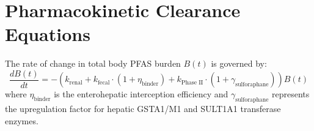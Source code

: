 \documentclass[11pt,a4paper]{article}
\begin{document}
\section{Pharmacokinetic Clearance Equations}
The rate of change in total body PFAS burden $B(t)$ is governed by:
\begin{equation}
\frac{dB(t)}{dt} = - \left( k_{\text{renal}} + k_{\text{fecal}} \cdot (1 + \eta_{\text{binder}}) + k_{\text{Phase II}} \cdot (1 + \gamma_{\text{sulforaphane}}) \right) B(t)
\end{equation}
where $\eta_{\text{binder}}$ is the enterohepatic interception efficiency and $\gamma_{\text{sulforaphane}}$ represents the upregulation factor for hepatic GSTA1/M1 and SULT1A1 transferase enzymes.
\end{document}
